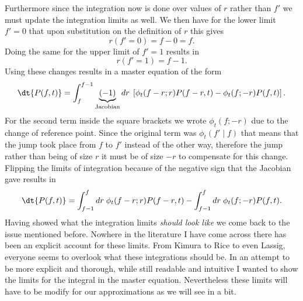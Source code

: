 Furthermore since the integration now is done over values of $r$ rather than
$f'$ we must update the integration limits as well. We then have for the lower
limit $f' = 0$ that upon substitution on the definition of $r$ this gives
\begin{equation}
  r(f' = 0) = f - 0 = f.
\end{equation}
Doing the same for the upper limit of $f' = 1$ results in
\begin{equation}
  r(f' = 1) = f - 1.
\end{equation}
Using these changes results in a master equation of the form
\begin{equation}
  \dt{P(f, t)} = \int_f^{f - 1} \underbrace{(-1)}_{\text{Jacobian}} dr \;
  \left[
  \phi_t(f - r; r) P(f - r, t) -
  \phi_t(f; -r) P(f, t)
  \right].
\end{equation}
For the second term inside the square brackets we wrote $\phi_t(f; -r)$ due to
the change of reference point. Since the original term was $\phi_t(f' \mid f)$
that means that the jump took place from $f$ to $f'$ instead of the other way,
therefore the jump rather than being of size $r$ it must be of size $-r$ to
compensate for this change. Flipping the limits of integration because of the
negative sign that the Jacobian gave results in
\begin{equation}
  \dt{P(f, t)} = \int^f_{f - 1} dr \;
  \phi_t(f - r; r) P(f - r, t) -
  \int^f_{f - 1} dr \;
  \phi_t(f; -r) P(f, t).
  \label{eq_master_eq_jump}
\end{equation}
Having showed what the integration limits \textit{should look like} we come
back to the issue mentioned before. Nowhere in the literature I have come
across there has been an explicit account for these limits. From Kimura to Rice
to even Lassig, everyone seems to overlook what these integrations should be.
In an attempt to be more explicit and thorough, while still readable and
intuitive I wanted to show the limits for the integral in the master equation.
Nevertheless these limits will have to be modify for our approximations as we
will see in a bit.

